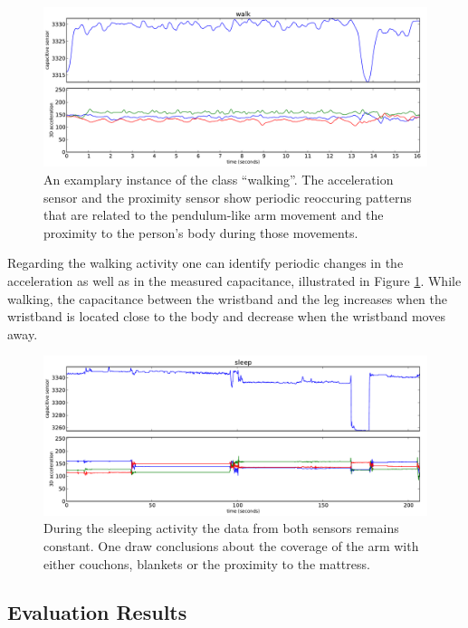 \documentclass[runningheads,a4paper]{llncs}
\begin{document}
\begin{figure}
	\centering
		\includegraphics[width=1.00\textwidth]{../Auswertung/images/marko_8.pdf}
	\caption{An examplary instance of the class ``walking''. The acceleration sensor and the proximity sensor show periodic reoccuring patterns that are related to the pendulum-like arm movement and the proximity to the person's body during those movements.}
	\label{fig:marko_8}
\end{figure}

Regarding the walking activity one can identify periodic changes in the acceleration as well as in the measured capacitance, illustrated in Figure \ref{fig:marko_8}. While walking, the capacitance between the wristband and the leg increases when the wristband is located close to the body and decrease when the wristband moves away. 

\begin{figure}
	\centering
		\includegraphics[width=1.00\textwidth]{../Auswertung/images/eugen_9.pdf}
	\caption{During the sleeping activity the data from both sensors remains constant. One draw conclusions about the coverage of the arm with either couchons, blankets or the proximity to the mattress.}
	\label{fig:eugen_9}
\end{figure}

\subsection{Evaluation Results}
\label{sect:evaluation}
\end{document}

